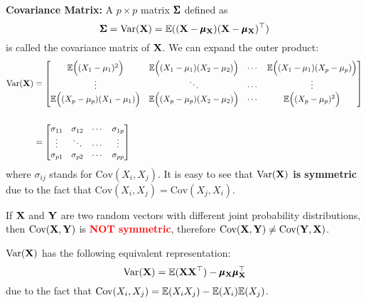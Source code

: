     \begin{Def}
        \textbf{Covariance Matrix:} A $p\times p$ matrix $\pmb{\Sigma}$ defined as
        \begin{equation*}
            \pmb{\Sigma} = \text{Var}(\mathbf{X}) = \mathbb{E}((\mathbf{X} - \pmb{\mu}_{\mathbf{X}})(\mathbf{X} - \pmb{\mu}_{\mathbf{X}})^{\top})
        \end{equation*}
        is called the covariance matrix of $\mathbf{X}$.
        We can expand the outer product:
        \begin{align*}
            \text{Var}(\mathbf{X}) &= \begin{bmatrix}
                \mathbb{E}\Big((X_1 - \mu_1)^2\Big) & \mathbb{E}\Big((X_1 - \mu_1)(X_2 - \mu_2)\Big) & \cdots &  \mathbb{E}\Big((X_1 - \mu_1)(X_p - \mu_p)\Big)\\
                \vdots & \ddots  & \cdots & \vdots\\
                \mathbb{E}\Big((X_p - \mu_p)(X_1 - \mu_1)\Big) & \mathbb{E}\Big((X_p - \mu_p)(X_2 - \mu_2)\Big) & \cdots &  \mathbb{E}\Big((X_p - \mu_p)^2\Big)
            \end{bmatrix}\\\\
            & = \begin{bmatrix}
                \sigma_{11} & \sigma_{12} & \cdots &  \sigma_{1p}\\
                \vdots & \ddots  & \cdots & \vdots\\
                \sigma_{p1} & \sigma_{p2} & \cdots &  \sigma_{pp}
            \end{bmatrix}
        \end{align*}
        where $\sigma_{ij}$ stands for $\text{Cov}(X_i, X_j)$. It is easy to see that \textbf{$\text{Var}(\mathbf{X})$ is symmetric} due to the fact that $\text{Cov}(X_i, X_j) = \text{Cov}(X_j, X_i)$.
        \begin{Rem}
            If $\mathbf{X}$ and $\mathbf{Y}$ are two random vectors with different joint probability distributions, then $\text{Cov}(\mathbf{X}, \mathbf{Y})$ is \textbf{\textcolor{red}{NOT symmetric}}, therefore $\text{Cov}(\mathbf{X}, \mathbf{Y})\neq \text{Cov}(\mathbf{Y}, \mathbf{X})$.
        \end{Rem}
    \end{Def}
    \begin{Thm}
        $\text{Var}(\mathbf{X})$ has the following equivalent representation:
        \begin{equation}
            \text{Var}(\mathbf{X}) = \mathbb{E}(\mathbf{X}\mathbf{X}^{\top}) - \pmb{\mu}_{\mathbf{X}}\pmb{\mu}_{\mathbf{X}}^{\top}
        \end{equation}
        due to the fact that $\text{Cov}(X_i, X_j) = \mathbb{E}(X_iX_j) - \mathbb{E}(X_i)\mathbb{E}(X_j)$.
    \end{Thm}
